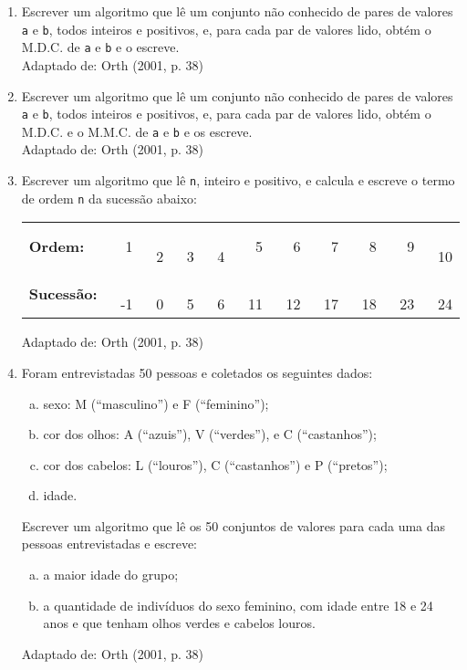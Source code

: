 \documentclass[onecolumn,a4paper,10pt]{report}
\newcommand{\+}{\, + \,}
\newcommand{\<}{\hspace*{-0.4cm}}
\begin{document}
\begin{enumerate}[1.]
\item Escrever um algoritmo que lê um conjunto não conhecido de pares de valores \texttt{a} e \texttt{b}, todos inteiros e positivos, e, para cada par de valores lido, obtém o M.D.C. de \texttt{a} e \texttt{b} e o escreve.\\
{\tiny Adaptado de: Orth (2001, p. 38)}

\item Escrever um algoritmo que lê um conjunto não conhecido de pares de valores \texttt{a} e \texttt{b}, todos inteiros e positivos, e, para cada par de valores lido, obtém o M.D.C. e o M.M.C. de \texttt{a} e \texttt{b} e os escreve.\\
{\tiny Adaptado de: Orth (2001, p. 38)}

\item Escrever um algoritmo que lê \texttt{n}, inteiro e positivo, e calcula e escreve o termo de ordem \texttt{n} da sucessão abaixo:
\begin{center}
\begin{tabular}{lrrrrrrrrrr}
\textbf{Ordem:} & ~ 1 & ~ 2 & ~ 3 & ~ 4 & ~ 5 & ~ 6 & ~ 7 & ~ 8 & ~ 9 & ~ 10 \\
\textbf{Sucessão:} & ~ -1 & ~ 0 & ~ 5 & ~ 6 & ~ 11 & ~ 12 & ~ 17 & ~ 18 & ~ 23 & ~ 24\\
\end{tabular}
\end{center}
{\tiny Adaptado de: Orth (2001, p. 38)}

\item Foram entrevistadas 50 pessoas e coletados os seguintes dados:
\begin{enumerate}[a)]
    \item sexo: M (``masculino'') e F (``feminino'');
    \item cor dos olhos: A (``azuis''), V (``verdes''), e C (``castanhos'');
    \item cor dos cabelos: L (``louros''), C (``castanhos'') e P (``pretos'');
    \item idade.
\end{enumerate}
Escrever um algoritmo que lê os 50 conjuntos de valores para cada uma das pessoas entrevistadas e escreve:
\begin{enumerate}[a)]
    \item a maior idade do grupo;
    \item a quantidade de indivíduos do sexo feminino, com idade entre 18 e 24 anos e que tenham olhos verdes e cabelos louros.
\end{enumerate}
{\tiny Adaptado de: Orth (2001, p. 38)}


\end{enumerate}
\end{document}
